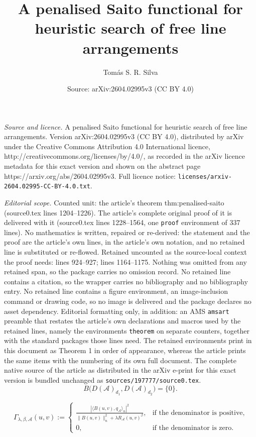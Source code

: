 \documentclass[10pt,a4paper]{amsart}
\title{A penalised Saito functional for heuristic search of free line arrangements}
\author{Tom\'as S. R. Silva}
\date{Source: arXiv:2604.02995v3 (CC BY 4.0)}
\begin{document}
\maketitle

\noindent\emph{Source and licence.} A penalised Saito functional for heuristic search of free line arrangements. Version arXiv:2604.02995v3 (CC BY 4.0), distributed by arXiv under the Creative Commons Attribution 4.0 International licence, http://creativecommons.org/licenses/by/4.0/, as recorded in the arXiv licence metadata for this exact version and shown on the abstract page https://arxiv.org/abs/2604.02995v3. Full licence notice: \texttt{licenses/arxiv-2604.02995-CC-BY-4.0.txt}.\par\smallskip

\noindent\textit{Editorial scope.} Counted unit: the article's theorem thm:penalised-saito (source0.tex lines 1204--1226). The article's complete original proof of it is delivered with it (source0.tex lines 1228--1564, one \texttt{proof} environment of 337 lines). No mathematics is written, repaired or re-derived: the statement and the proof are the article's own lines, in the article's own notation, and no retained line is substituted or re-flowed.  Retained uncounted as the source-local context the proof needs: lines 924--927; lines 1164--1175.  Nothing was omitted from any retained span, so the package carries no omission record.  No retained line contains a citation, so the wrapper carries no bibliography and no bibliography entry.  No retained line contains a figure environment, an image-inclusion command or drawing code, so no image is delivered and the package declares no asset dependency.  Editorial formatting only, in addition: an AMS \texttt{amsart} preamble that restates the article's own declarations and macros used by the retained lines, namely the environments \texttt{theorem} on separate counters, together with the standard packages those lines need.  The retained environments print in this document as Theorem 1 in order of appearance, whereas the article prints the same items with the numbering of its own full document.  The complete native source of the article as distributed in the arXiv e-print for this exact version is bundled unchanged as \texttt{sources/197777/source0.tex}.
\begin{equation}
\label{eq:kernel-determinant-zero}
B\bigl(D(\mathcal{A})_{d_1},D(\mathcal{A})_{d_2}\bigr)=\{0\}.
\end{equation}

\begin{equation}
\label{eq:penalised-alignment}
\Gamma_{\lambda,\beta,\mathcal{A}}(u,v)
:=
\begin{cases}
\displaystyle
\frac{|\langle B(u,v),q_{\mathcal{A}}\rangle_n|^2}
{\|B(u,v)\|_n^2+\lambda R_{\mathcal{A}}(u,v)^\beta},
&\text{if the denominator is positive},\\[1.2em]
0,&\text{if the denominator is zero}.
\end{cases}
\end{equation}
\end{document}
